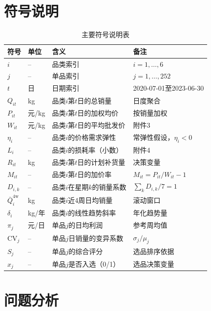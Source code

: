 \documentclass[12pt,a4paper]{ctexart}
\begin{document}
\section{符号说明}

\begin{table}[H]
\centering
\caption{主要符号说明表}
\begin{tabularx}{\textwidth}{p{2.5cm}p{1.5cm}p{7cm}Y}
\toprule
符号 & 单位 & 含义 & 备注 \\
\midrule
$i$ & -- & 品类索引 & $i=1,\ldots,6$ \\
$j$ & -- & 单品索引 & $j=1,\ldots,252$ \\
$t$ & 日 & 日期索引 & 2020-07-01至2023-06-30 \\
$Q_{it}$ & kg & 品类$i$第$t$日的总销量 & 日度聚合 \\
$P_{it}$ & 元/kg & 品类$i$第$t$日的加权均价 & 按销量加权 \\
$W_{it}$ & 元/kg & 品类$i$第$t$日的平均批发价 & 附件3 \\
$\eta_i$ & -- & 品类$i$的价格需求弹性 & 常弹性假设，$\eta_i<0$ \\
$L_i$ & -- & 品类$i$的损耗率（小数） & 附件4 \\
$R_{it}$ & kg & 品类$i$第$t$日的计划补货量 & 决策变量 \\
$M_{it}$ & -- & 品类$i$第$t$日的加价率 & $M_{it}=P_{it}/W_{it}-1$ \\
$D_{i,k}$ & -- & 品类$i$在星期$k$的销量系数 & $\sum_k D_{i,k}/7 = 1$ \\
$\bar{Q}_i^{\text{4w}}$ & kg & 品类$i$近4周日均销量 & 滚动窗口 \\
$\delta_i$ & kg/年 & 品类$i$的线性趋势斜率 & 年化趋势量 \\
$\pi_j$ & 元/日 & 单品$j$的日均利润 & 参考周均值 \\
$\text{CV}_j$ & -- & 单品$j$日销量的变异系数 & $\sigma_j / \mu_j$ \\
$S_j$ & -- & 单品$j$的综合评分 & 选品排序依据 \\
$x_j$ & -- & 单品$j$是否入选（0/1） & 选品决策变量 \\
\bottomrule
\end{tabularx}
\end{table}

\section{问题分析}
\end{document}
